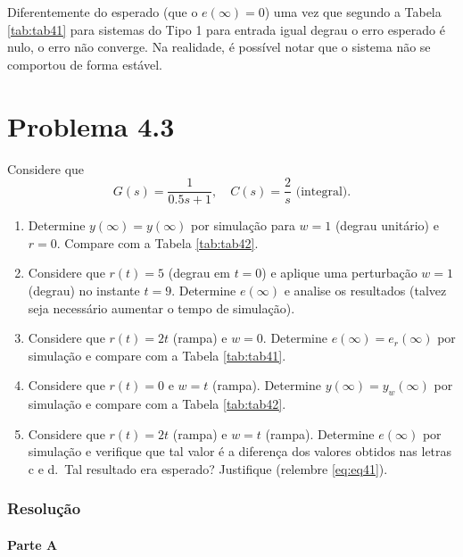 \documentclass[
]{book}
\providecommand{\tightlist}{%
  \setlength{\itemsep}{0pt}\setlength{\parskip}{0pt}}
\theoremstyle{definition}
\theoremstyle{definition}
\theoremstyle{definition}
\theoremstyle{remark}
\begin{document}
Diferentemente do esperado (que o \(e(\infty) = 0\)) uma vez que segundo a Tabela \ref{tab:tab41} para sistemas do Tipo 1 para entrada igual degrau o erro esperado é nulo, o erro não converge. Na realidade, é possível notar que o sistema não se comportou de forma estável.

\hypertarget{problema-4.3}{%
\section*{Problema 4.3}\label{problema-4.3}}

Considere que
\[
G(s) = \frac {1}{0.5s +1}, \quad C(s) = \frac {2}{s} \text{ (integral)}.
\]

\begin{enumerate}
\def\labelenumi{\alph{enumi}.}
\tightlist
\item
  Determine \(y(\infty) = y(\infty)\) por simulação para \(w =1\) (degrau unitário) e \(r=0\). Compare com a Tabela \ref{tab:tab42}.
\item
  Considere que \(r(t) = 5\) (degrau em \(t=0\)) e aplique uma perturbação \(w=1\) (degrau) no instante \(t=9\). Determine \(e(\infty)\) e analise os resultados (talvez seja necessário aumentar o tempo de simulação).
\item
  Considere que \(r(t) = 2t\) (rampa) e \(w=0\). Determine \(e(\infty) = e_r(\infty)\) por simulação e compare com a Tabela \ref{tab:tab41}.
\item
  Considere que \(r(t) = 0\) e \(w=t\) (rampa). Determine \(y(\infty) = y_w(\infty)\) por simulação e compare com a Tabela \ref{tab:tab42}.
\item
  Considere que \(r(t) = 2t\) (rampa) e \(w=t\) (rampa). Determine \(e(\infty)\) por simulação e verifique que tal valor é a diferença dos valores obtidos nas letras c e d.~Tal resultado era esperado? Justifique (relembre \eqref{eq:eq41}).
\end{enumerate}

\hypertarget{resoluuxe7uxe3o-1}{%
\subsubsection*{Resolução}\label{resoluuxe7uxe3o-1}}

\hypertarget{parte-a-2}{%
\paragraph*{Parte A}\label{parte-a-2}}
\end{document}
